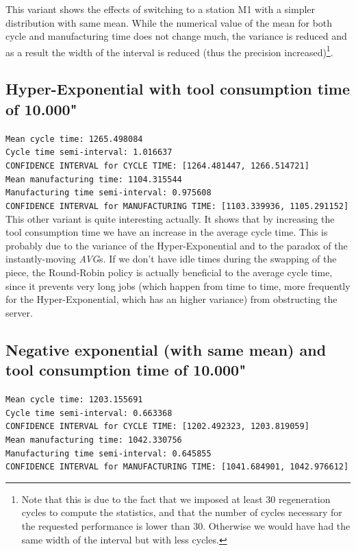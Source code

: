 \documentclass[paper=a4, fontsize=11pt]{scrartcl}
\numberwithin{equation}{section}		%
\numberwithin{figure}{section}			%
\numberwithin{table}{section}				%
\begin{document}
This variant shows the effects of switching to a station M1 with a simpler distribution with same mean. While the numerical value of the mean for both cycle and manufacturing time does not change much, the variance is reduced and as a result the width of the interval is reduced (thus the precision increased)\footnote{Note that this is due to the fact that we imposed at least 30 regeneration cycles to compute the statistics, and that the number of cycles necessary for the requested performance is lower than 30. Otherwise we would have had the same width of the interval but with less cycles.}.

\subsection{Hyper-Exponential with tool consumption time of 10.000"} \label{subsec:proj3}
\texttt{Mean cycle time: 1265.498084\\
Cycle time semi-interval: 1.016637\\
CONFIDENCE INTERVAL for CYCLE TIME: [1264.481447, 1266.514721]\\
Mean manufacturing time: 1104.315544\\
Manufacturing time semi-interval: 0.975608\\
CONFIDENCE INTERVAL for MANUFACTURING TIME: [1103.339936, 1105.291152]}\\

This other variant is quite interesting actually. It shows that by increasing the tool consumption time we have an increase in the average cycle time. This is probably due to the variance of the Hyper-Exponential and to the paradox of the instantly-moving \textit{AVG}s. If we don't have idle times during the swapping of the piece, the Round-Robin policy is actually beneficial to the average cycle time, since it prevents very long jobs (which happen from time to time, more frequently for the Hyper-Exponential, which has an higher variance) from obstructing the server.

\subsection{Negative exponential (with same mean) and tool consumption time of 10.000"}
\texttt{Mean cycle time: 1203.155691\\
Cycle time semi-interval: 0.663368\\
CONFIDENCE INTERVAL for CYCLE TIME: [1202.492323, 1203.819059]\\
Mean manufacturing time: 1042.330756\\
Manufacturing time semi-interval: 0.645855\\
CONFIDENCE INTERVAL for MANUFACTURING TIME: [1041.684901, 1042.976612]}\\
\end{document}
